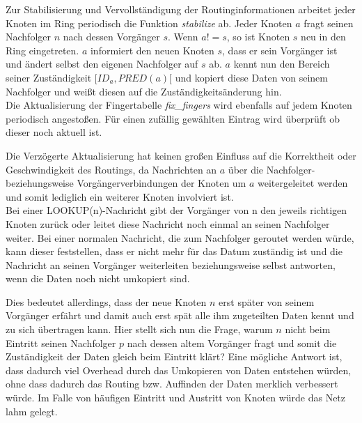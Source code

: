 Zur Stabilisierung und Vervollständigung der Routinginformationen arbeitet jeder Knoten im Ring periodisch die Funktion \emph{stabilize} ab. Jeder Knoten $a$ fragt seinen Nachfolger $n$ nach dessen Vorgänger $s$. Wenn $a != s$, so ist Knoten $s$ neu in den Ring eingetreten. $a$ informiert den neuen Knoten $s$, dass er sein Vorgänger ist und ändert selbst den eigenen Nachfolger auf $s$ ab. $a$ kennt nun den Bereich seiner Zuständigkeit $[ID_a, PRED(a)[$ und kopiert diese Daten von seinem Nachfolger und weißt diesen auf die Zuständigkeitsänderung hin.\\
Die Aktualisierung der Fingertabelle \emph{fix\_fingers} wird ebenfalls auf jedem Knoten periodisch angestoßen. Für einen zufällig gewählten Eintrag wird überprüft ob dieser noch aktuell ist.

Die Verzögerte Aktualisierung hat keinen großen Einfluss auf die Korrektheit oder Geschwindigkeit des Routings, da Nachrichten an $a$ über die Nachfolger- beziehungsweise Vorgängerverbindungen der Knoten um $a$ weitergeleitet werden und somit lediglich ein weiterer Knoten involviert ist.\\
Bei einer LOOKUP(n)-Nachricht gibt der Vorgänger von n den jeweils richtigen Knoten zurück oder leitet diese Nachricht noch einmal an seinen Nachfolger weiter. Bei einer normalen Nachricht, die zum Nachfolger geroutet werden würde, kann dieser feststellen, dass er nicht mehr für das Datum zuständig ist und die Nachricht an seinen Vorgänger weiterleiten beziehungsweise selbst antworten, wenn die Daten noch nicht umkopiert sind. 

Dies bedeutet allerdings, dass der neue Knoten $n$ erst später von seinem Vorgänger erfährt und damit auch erst spät alle ihm zugeteilten Daten kennt und zu sich übertragen kann. Hier stellt sich nun die Frage, warum $n$ nicht beim Eintritt seinen Nachfolger $p$ nach dessen altem Vorgänger fragt und somit die Zuständigkeit der Daten gleich beim Eintritt klärt? Eine mögliche Antwort ist, dass dadurch viel Overhead durch das Umkopieren von Daten entstehen würden, ohne dass dadurch das Routing bzw. Auffinden der Daten merklich verbessert würde. Im Falle von häufigen Eintritt und Austritt von Knoten würde das Netz lahm gelegt.

